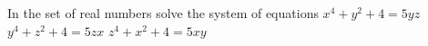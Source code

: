 In the set of real numbers solve the system of equations
$x^4+y^2+4=5yz$
$y^4+z^2+4=5zx$
$z^4+x^2+4=5xy$